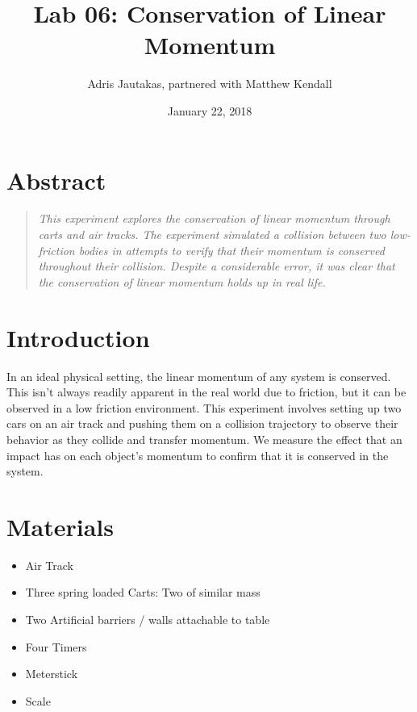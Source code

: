 \documentclass[12pt]{article}
\title{Lab 06: Conservation of Linear Momentum}
\author{Adris Jautakas, partnered with Matthew Kendall}
\date{January 22, 2018}
\begin{document}
   \maketitle

    \pagebreak

    \section*{Abstract}
        \begin{quote}
        {\textit {\small 
            This experiment explores the conservation of linear momentum through
            carts and air tracks. The experiment simulated a collision between
            two low-friction bodies in attempts to verify that their momentum
            is conserved throughout their collision. Despite a considerable
            error, it was clear that the conservation of linear momentum
            holds up in real life.
        } }
        \end{quote}

    \section{Introduction}
        In an ideal physical setting, the linear momentum of any system is conserved.
        This isn't always readily apparent in the real world due to friction, but
        it can be observed in a low friction environment. This experiment involves
        setting up two cars on an air track and pushing them on a collision trajectory
        to observe their behavior as they collide and transfer momentum. We measure
        the effect that an impact has on each object's momentum to confirm that it
        is conserved in the system.
    \section{Materials}
        \begin{itemize}
            \item Air Track
            \item Three spring loaded Carts: Two of similar mass
            \item Two Artificial barriers / walls attachable to table
            \item Four Timers
            \item Meterstick
            \item Scale
        \end{itemize}
    
\end{document}
